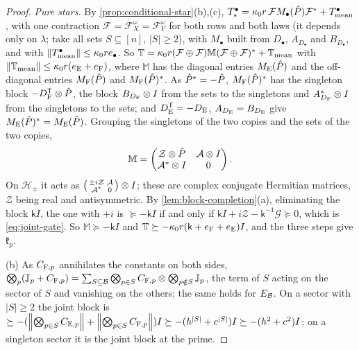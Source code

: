 \begin{proof}
\emph{Pure stars.} By \cref{prop:conditional-star}(b),(c),
$T^\bullet_\star=\kappa_0r\,\mathcal FM_\bullet(\hat P)\mathcal F^*+T^\bullet_{\rm mean}$,
with one contraction $\mathcal F=\mathcal F^\omega_X=\mathcal F^\omega_Y$ for both rows and
both laws (it depends only on $\lambda$; take all sets $S\subseteq[n]$, $|S|\ge2$),
with $M_\bullet$ built from $D_\bullet$, $A_{D_\bullet}$ and $B_{D_\bullet}$, and with
$\left\|T^\bullet_{\rm mean}\right\|\le\kappa_0re_\bullet$. So
$\mathbb T=\kappa_0r(\mathcal F\oplus\mathcal F)\mathbb M(\mathcal F\oplus\mathcal F)^*
+\mathbb T_{\rm mean}$ with $\left\|\mathbb T_{\rm mean}\right\|\le\kappa_0r(e_{\rm E}+e_{\rm F})$,
where $\mathbb M$ has the diagonal entries $M_{\rm E}(\hat P)$ and the off-diagonal entries
$M_{\rm F}(\hat P)$ and $M_{\rm F}(\hat P)^*$. As $\hat P^*=-\hat P$, $M_{\rm F}(\hat P)^*$ has the
singleton block $-D_{\rm F}^{\mathsf T}\otimes\hat P$, the block $B_{D_{\rm F}}\otimes I$
from the sets to the singletons and $A_{D_{\rm F}}^*\otimes I$ from the singletons to the
sets; and $D_{\rm E}^{\mathsf T}=-D_{\rm E}$, $A_{D_{\rm E}}=B_{D_{\rm E}}$ give
$M_{\rm E}(\hat P)^*=M_{\rm E}(\hat P)$. Grouping the singletons of the two copies and the
sets of the two copies,
\[
 \mathbb M=\begin{pmatrix}\mathcal Z\otimes\hat P&\mathcal A\otimes I\\
 \mathcal A^*\otimes I&0\end{pmatrix}.
\]
On $\mathcal H_\pm$ it acts as $\begin{psmallmatrix}\pm i\mathcal Z&\mathcal A\\
\mathcal A^*&0\end{psmallmatrix}\otimes I$; these are complex conjugate Hermitian
matrices, $\mathcal Z$ being real and antisymmetric. By
\cref{lem:block-completion}(a), eliminating the block $\mathsf kI$, the one with $+i$ is $\succeq-\mathsf kI$ if and only if
$\mathsf kI+i\mathcal Z-\mathsf k^{-1}\mathcal G\succeq0$, which is \eqref{eq:joint-gate}.
So $\mathbb M\succeq-\mathsf kI$ and
$\mathbb T\succeq-\kappa_0r(\mathsf k+e_{\rm F}+e_{\rm E})I$, and the three steps give
$\mathfrak k_p$.

(b) As $C_{{\rm F},p}$ annihilates the constants on both sides,
$\bigotimes_p(\mathbb J_p+C_{{\rm F},p})=\sum_{S\subseteq\mathcal B}\bigotimes_{p\in S}C_{{\rm F},p}
\otimes\bigotimes_{p\notin S}\mathbb J_p$, the term of $S$ acting on the sector of $S$ and
vanishing on the others; the same holds for $E_\mathcal B$. On a sector with $|S|\ge2$ the
joint block is
$\succeq-(\left\|\bigotimes_{p\in S}C_{{\rm E},p}\right\|+\left\|\bigotimes_{p\in S}C_{{\rm F},p}\right\|)I
\succeq-(h^{|S|}+c^{|S|})I\succeq-(h^2+c^2)I$; on a singleton sector it is the joint
block at the prime.


\end{proof}

